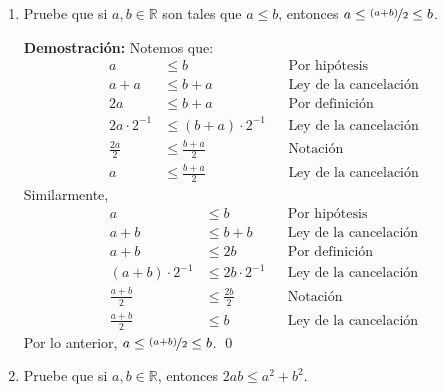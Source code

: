 \documentclass[11pt]{article}
\newcommand{\R}{\mathbb{R}}
\begin{document}
\begin{enumerate}
\pagebreak

\item Pruebe que si $a,b\in \R$ son tales que $a\leq b$, entonces $a\leq \nicefrac{(a+b)}{2}\leq b$.

\textbf{Demostración:}
Notemos que: \begin{align*}
  a &\leq b && \text{Por hipótesis} \\
  a + a &\leq b+a && \text{Ley de la cancelación} \\
  2a &\leq b+a && \text{Por definición} \\
  2a \cdot 2^{-1} &\leq (b+a) \cdot 2^{-1} && \text{Ley de la cancelación} \\
  \frac{2a}{2} &\leq \frac{b+a}{2} && \text{Notación} \\
  a &\leq \frac{b+a}{2} && \text{Ley de la cancelación}
\end{align*} Similarmente,
\begin{align*}
  a &\leq b && \text{Por hipótesis} \\
  a + b &\leq b+b && \text{Ley de la cancelación} \\
  a +b &\leq 2b && \text{Por definición} \\
  (a+b) \cdot 2^{-1} &\leq 2b \cdot 2^{-1} && \text{Ley de la cancelación} \\
  \frac{a+b}{2} &\leq \frac{2b}{2} && \text{Notación} \\
  \frac{a+b}{2} &\leq b && \text{Ley de la cancelación}
\end{align*} Por lo anterior, $a \leq \nicefrac{(a+b)}{2} \leq b$. \qed

\item Pruebe que si $a,b\in \R$, entonces $2ab\leq a^2+b^2$.


\end{enumerate}
\end{document}
